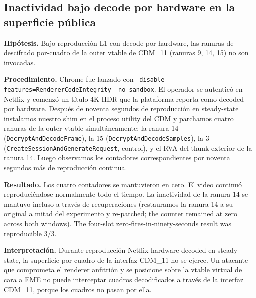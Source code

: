 \documentclass[11pt,letterpaper]{article}
\begin{document}
\subsection{Inactividad bajo decode por hardware en la superficie pública}
\label{sec:findings-dormancy}

\textbf{Hipótesis.} Bajo reproducción L1 con decode por hardware,
las ranuras de descifrado por-cuadro de la outer vtable de
CDM\_11 (ranuras 9, 14, 15) no son invocadas.

\textbf{Procedimiento.} Chrome fue lanzado con
\texttt{--disable-features=RendererCodeIntegrity --no-sandbox}.
El operador se autenticó en Netflix y comenzó un título 4K HDR
que la plataforma reporta como decoded por hardware. Después de
noventa segundos de reproducción en steady-state instalamos
nuestro shim en el proceso utility del CDM y parchamos cuatro
ranuras de la outer-vtable simultáneamente: la ranura 14
(\texttt{DecryptAndDecodeFrame}), la 15
(\texttt{DecryptAndDecodeSamples}), la 3
(\texttt{CreateSessionAndGenerateRequest}, control), y el RVA
del thunk exterior de la ranura 14. Luego observamos los
contadores correspondientes por noventa segundos más de
reproducción continua.

\textbf{Resultado.} Los cuatro contadores se mantuvieron en
cero. El video continuó reproduciéndose normalmente todo el
tiempo. La inactividad de la ranura 14 se mantuvo incluso a
través de recuperaciones (restauramos la ranura 14 a su original
a mitad del experimento y
re-patched; the counter remained at zero across both windows). The
four-slot zero-fires-in-ninety-seconds result was reproducible
3/3.

\textbf{Interpretación.} Durante reproducción Netflix
hardware-decoded en steady-state, la superficie por-cuadro de la
interfaz CDM\_11 no se ejerce. Un atacante que comprometa el
renderer anfitrión y se posicione sobre la vtable virtual de cara
a EME no puede interceptar cuadros decodificados a través de la
interfaz CDM\_11, porque los cuadros no pasan por ella.
\end{document}
